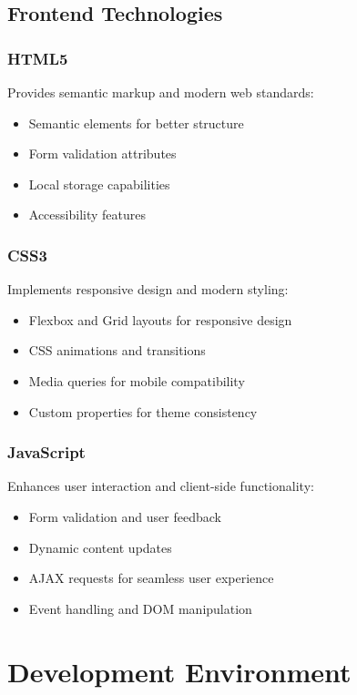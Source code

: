 \subsection{Frontend Technologies}

\subsubsection{HTML5}
Provides semantic markup and modern web standards:
\begin{itemize}
    \item Semantic elements for better structure
    \item Form validation attributes
    \item Local storage capabilities
    \item Accessibility features
\end{itemize}

\subsubsection{CSS3}
Implements responsive design and modern styling:
\begin{itemize}
    \item Flexbox and Grid layouts for responsive design
    \item CSS animations and transitions
    \item Media queries for mobile compatibility
    \item Custom properties for theme consistency
\end{itemize}

\subsubsection{JavaScript}
Enhances user interaction and client-side functionality:
\begin{itemize}
    \item Form validation and user feedback
    \item Dynamic content updates
    \item AJAX requests for seamless user experience
    \item Event handling and DOM manipulation
\end{itemize}

\section{Development Environment}

